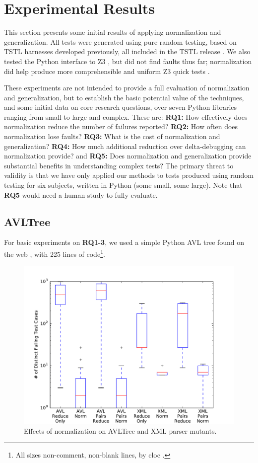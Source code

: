 \section {Experimental Results}

This section presents some initial results of applying normalization
and generalization.  All tests were generated using pure random testing,
based on TSTL harnesses developed previously, all included in the
TSTL release \cite{tstl}.  We also tested the
Python interface to Z3 \cite{z3}, but did not find faults thus far;
normalization did help produce more comprehensible and uniform Z3
quick tests \cite{icst2014}.

These experiments are not intended to provide a full evaluation of
normalization and generalization, but to establish the basic potential
value of
the techniques, and some initial data on core research questions, over
seven Python libraries ranging from small to large and complex.
These are:
{\bf RQ1:} How effectively does normalization reduce the number of
failures reported? {\bf RQ2:} How often does normalization lose
faults? {\bf RQ3:} What is the cost of normalization and generalization? {\bf RQ4:} How
much additional reduction over delta-debugging can normalization
provide? and {\bf RQ5:} Does normalization and generalization provide
substantial benefits in understanding complex tests?
The primary
threat to validity is that we have only applied our methods  to tests produced using random testing for 
six subjects, written in Python (some small, some large).  Note that {\bf RQ5} would need a human study to fully evaluate.

\subsection{AVLTree}

For basic experiments on {\bf RQ1-3}, we used a
simple Python AVL tree found on the web
\cite{avltree}, with 225 lines of code\footnote{All sizes non-comment, non-blank lines, by cloc \cite{cloc}.}.

\begin{figure}
\includegraphics[width=\columnwidth]{length}
\caption{Effects of normalization on AVLTree and XML parser mutants.}
\label{normeffect}
\end{figure}

